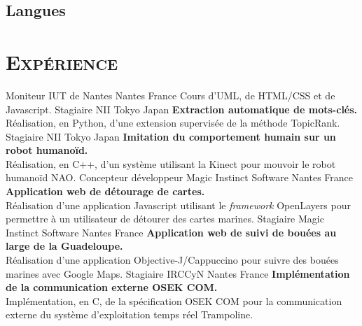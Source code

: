 \documentclass[10pt, a4paper]{moderncv}
\begin{document}
    \subsection{Langues}

  \section{\textsc{Expérience}}
            {Moniteur}                                    %
            {IUT de Nantes}                               %
            {Nantes}                                      %
            {France}                                      %
            {Cours d'UML, de HTML/CSS et de Javascript.}  %
            {Stagiaire}
            {NII}
            {Tokyo}
            {Japan}
            {\textbf{Extraction automatique de mots-clés.}\\
             Réalisation, en Python, d'une extension supervisée de la méthode
             TopicRank.}
            {Stagiaire}
            {NII}
            {Tokyo}
            {Japan}
            {\textbf{Imitation du comportement humain sur un robot humanoïd.}\\
             Réalisation, en C++, d'un système utilisant la Kinect pour mouvoir
             le robot humanoïd NAO.}
            {Concepteur développeur}
            {Magic Instinct Software}
            {Nantes}
            {France}
            {\textbf{Application web de détourage de cartes.}\\
             Réalisation d'une application Javascript utilisant le
             \textit{framework} OpenLayers pour permettre à un utilisateur de
             détourer des cartes marines.}
            {Stagiaire}
            {Magic Instinct Software}
            {Nantes}
            {France}
            {\textbf{Application web de suivi de bouées au large de la
             Guadeloupe.}\\
             Réalisation d'une application Objective-J/Cappuccino pour suivre
             des bouées marines avec Google Maps.}
            {Stagiaire}
            {IRCCyN}
            {Nantes}
            {France}
            {\textbf{Implémentation de la communication externe OSEK COM.}\\
             Implémentation, en C, de la spécification OSEK COM pour la
             communication externe du système d'exploitation temps réel
             Trampoline.}

  \newpage
  
  
  \nocite{*}
\end{document}
